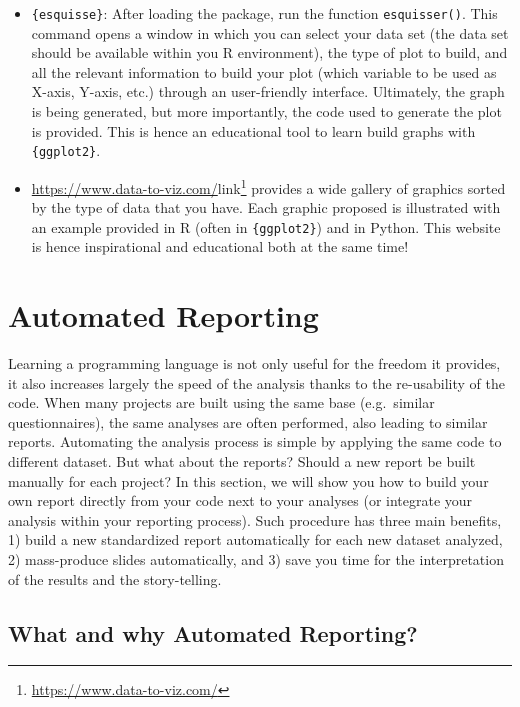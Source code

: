 \documentclass[
]{krantz}
\providecommand{\tightlist}{%
  \setlength{\itemsep}{0pt}\setlength{\parskip}{0pt}}
\renewenvironment{quote}{\begin{VF}}{\end{VF}}
\renewcommand{\href}[2]{#2\footnote{\url{#1}}}
\begin{document}
\begin{itemize}
\tightlist
\item
  \texttt{\{esquisse\}}: After loading the package, run the function \texttt{esquisser()}. This command opens a window in which you can select your data set (the data set should be available within you R environment), the type of plot to build, and all the relevant information to build your plot (which variable to be used as X-axis, Y-axis, etc.) through an user-friendly interface. Ultimately, the graph is being generated, but more importantly, the code used to generate the plot is provided. This is hence an educational tool to learn build graphs with \texttt{\{ggplot2\}}.
\item
  \url{https://www.data-to-viz.com/}\href{https://www.data-to-viz.com/}{link} provides a wide gallery of graphics sorted by the type of data that you have. Each graphic proposed is illustrated with an example provided in R (often in \texttt{\{ggplot2\}}) and in Python. This website is hence inspirational and educational both at the same time!
\end{itemize}

\hypertarget{auto-report}{%
\chapter{Automated Reporting}\label{auto-report}}

\begin{quote}
Learning a programming language is not only useful for the freedom it provides, it also increases largely the speed of the analysis thanks to the re-usability of the code. When many projects are built using the same base (e.g.~similar questionnaires), the same analyses are often performed, also leading to similar reports. Automating the analysis process is simple by applying the same code to different dataset. But what about the reports? Should a new report be built manually for each project?
In this section, we will show you how to build your own report directly from your code next to your analyses (or integrate your analysis within your reporting process). Such procedure has three main benefits, 1) build a new standardized report automatically for each new dataset analyzed, 2) mass-produce slides automatically, and 3) save you time for the interpretation of the results and the story-telling.
\end{quote}

\hypertarget{what-and-why-automated-reporting}{%
\section{What and why Automated Reporting?}\label{what-and-why-automated-reporting}}
\end{document}
